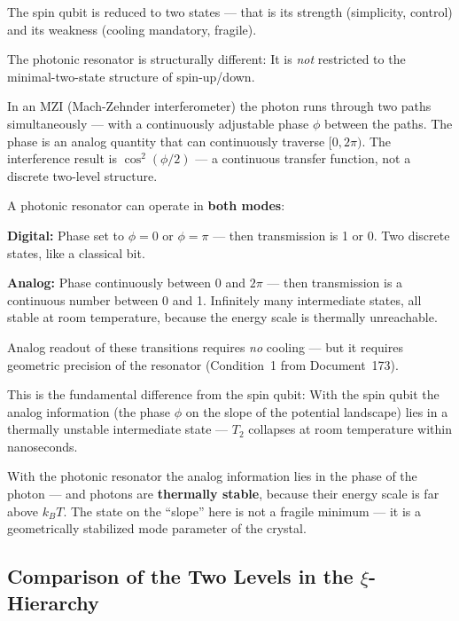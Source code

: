 The spin qubit is reduced to two states ---
that is its strength (simplicity, control)
and its weakness (cooling mandatory, fragile).

The photonic resonator is structurally different:
It is \emph{not} restricted to the minimal-two-state structure
of spin-up/down.

In an MZI (Mach-Zehnder interferometer)
the photon runs through two paths simultaneously ---
with a continuously adjustable phase $\phi$
between the paths.
The phase is an analog quantity that
can continuously traverse $[0, 2\pi)$.
The interference result is $\cos^2(\phi/2)$ ---
a continuous transfer function,
not a discrete two-level structure.

\begin{keypoint}
A photonic resonator can operate in \textbf{both modes}:

\textbf{Digital:} Phase set to $\phi = 0$ or $\phi = \pi$ ---
then transmission is 1 or 0.
Two discrete states, like a classical bit.

\textbf{Analog:} Phase continuously between 0 and $2\pi$ ---
then transmission is a continuous number
between 0 and 1. Infinitely many intermediate states,
all stable at room temperature, because the energy scale
is thermally unreachable.

Analog readout of these transitions requires
\emph{no} cooling --- but it requires
geometric precision of the resonator
(Condition~1 from Document~173).
\end{keypoint}

This is the fundamental difference from the spin qubit:
With the spin qubit the analog information
(the phase $\phi$ on the slope of the potential landscape)
lies in a thermally unstable intermediate state ---
$T_2$ collapses at room temperature within nanoseconds.

With the photonic resonator the analog information
lies in the phase of the photon --- and photons are
\textbf{thermally stable}, because their energy scale
is far above $k_BT$.
The state on the ``slope'' here is not a
fragile minimum --- it is a geometrically
stabilized mode parameter of the crystal.

\subsection{Comparison of the Two Levels in the \texorpdfstring{$\xi$}{xi}-Hierarchy}
\label{sec:xi-comparison}

